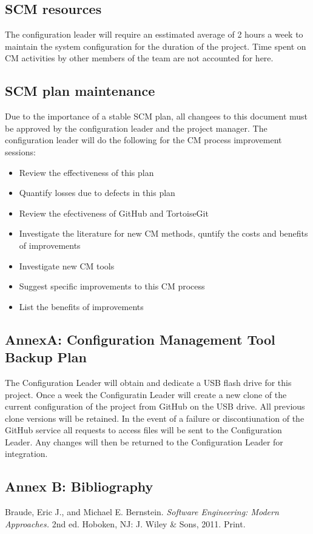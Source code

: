 \documentclass{scrartcl}
\begin{document}
\subsection{SCM resources}
The configuration leader will require an esstimated average of 2 hours a week to maintain the system configuration for the duration of the project.  Time spent on CM activities by other members of the team are not accounted for here.

\subsection{SCM plan maintenance}
Due to the importance of a stable SCM plan, all changees to this document must be approved by the configuration leader and the project manager.
\newline \newline
The configuration leader will do the following for the CM process improvement sessions:
\begin{itemize}
\item Review the effectiveness of this plan
\item Quantify losses due to defects in this plan
\item Review the efectiveness of GitHub and TortoiseGit
\item Investigate the literature for new CM methods, quntify the costs and benefits of improvements
\item Investigate new CM tools
\item Suggest specific improvements to this CM process
\item List the benefits of improvements
\end{itemize}

\newpage
\setcounter{secnumdepth}{0} 
\subsection{AnnexA: Configuration Management Tool Backup Plan}
The Configuration Leader will obtain and dedicate a USB flash drive for this project.  Once a week the Configuratin Leader will create a new clone of the current configuration of the project from GitHub on the USB drive.  All previous clone versions will be retained.  In the event of a failure or discontiunation of the GitHub service all requests to access files will be sent to the Configuration Leader.  Any changes will then be returned to the Configuration Leader for integration. 
\newpage
\subsection{Annex B: Bibliography}
Braude, Eric J., and Michael E. Bernstein. \textit{Software Engineering: Modern Approaches.} 2nd ed. Hoboken, NJ: J. Wiley \& Sons, 2011. Print.
\newline
\end{document}
